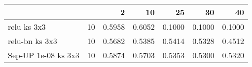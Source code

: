 \begin{tabular}{llrrrrr}
\toprule
                    &    &      2  &      10 &      25 &      30 &      40 \\
\midrule
relu ks 3x3 & 10 &  0.5958 &  0.6052 &  0.1000 &  0.1000 &  0.1000 \\
relu-bn ks 3x3 & 10 &  0.5682 &  0.5385 &  0.5414 &  0.5328 &  0.4512 \\
Sep-UP 1e-08 ks 3x3 & 10 &  0.5874 &  0.5703 &  0.5353 &  0.5300 &  0.5320 \\
\bottomrule
\end{tabular}
